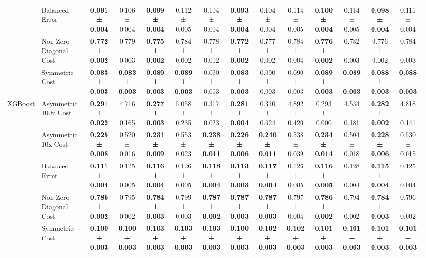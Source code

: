 \begin{table}[H]
{\begin{tabular}{llcccccccccccc}
 & Balanced Error & \textbf{0.091 ± 0.004} & 0.106 ± 0.004 & \textbf{0.099 ± 0.004} & 0.112 ± 0.005 & 0.104 ± 0.004 & \textbf{0.093 ± 0.004} & 0.104 ± 0.004 & 0.114 ± 0.005 & \textbf{0.100 ± 0.004} & 0.114 ± 0.005 & \textbf{0.098 ± 0.004} & 0.111 ± 0.004 \\
 & Non-Zero Diagonal Cost & \textbf{0.772 ± 0.002} & 0.779 ± 0.003 & \textbf{0.775 ± 0.002} & 0.784 ± 0.002 & 0.778 ± 0.002 & \textbf{0.772 ± 0.002} & 0.777 ± 0.002 & 0.784 ± 0.004 & \textbf{0.776 ± 0.002} & 0.782 ± 0.003 & 0.776 ± 0.002 & 0.784 ± 0.003 \\
 & Symmetric Cost & \textbf{0.083 ± 0.003} & \textbf{0.083 ± 0.003} & \textbf{0.089 ± 0.003} & \textbf{0.089 ± 0.003} & 0.090 ± 0.003 & \textbf{0.083 ± 0.003} & 0.090 ± 0.003 & 0.090 ± 0.003 & \textbf{0.089 ± 0.003} & \textbf{0.089 ± 0.003} & \textbf{0.088 ± 0.003} & \textbf{0.088 ± 0.003} \\
\cline{1-14}
\multirow[t]{5}{*}{XGBoost} & Asymmetric 100x Cost & \textbf{0.291 ± 0.022} & 4.716 ± 0.165 & \textbf{0.277 ± 0.003} & 5.058 ± 0.235 & 0.317 ± 0.023 & \textbf{0.281 ± 0.004} & 0.310 ± 0.024 & 4.892 ± 0.420 & 0.293 ± 0.000 & 4.534 ± 0.181 & \textbf{0.282 ± 0.002} & 4.818 ± 0.141 \\
 & Asymmetric 10x Cost & \textbf{0.225 ± 0.008} & 0.520 ± 0.016 & \textbf{0.231 ± 0.009} & 0.553 ± 0.023 & \textbf{0.238 ± 0.011} & \textbf{0.226 ± 0.006} & \textbf{0.240 ± 0.011} & 0.538 ± 0.039 & \textbf{0.234 ± 0.014} & 0.504 ± 0.018 & \textbf{0.228 ± 0.006} & 0.530 ± 0.015 \\
 & Balanced Error & \textbf{0.111 ± 0.004} & 0.125 ± 0.005 & \textbf{0.116 ± 0.004} & 0.126 ± 0.005 & \textbf{0.118 ± 0.004} & \textbf{0.113 ± 0.003} & \textbf{0.117 ± 0.004} & 0.126 ± 0.005 & \textbf{0.116 ± 0.005} & 0.128 ± 0.004 & \textbf{0.115 ± 0.004} & 0.125 ± 0.004 \\
 & Non-Zero Diagonal Cost & \textbf{0.786 ± 0.002} & 0.795 ± 0.002 & \textbf{0.784 ± 0.003} & 0.799 ± 0.003 & \textbf{0.787 ± 0.002} & \textbf{0.787 ± 0.003} & \textbf{0.787 ± 0.003} & 0.797 ± 0.004 & \textbf{0.786 ± 0.002} & 0.794 ± 0.002 & \textbf{0.784 ± 0.003} & 0.796 ± 0.002 \\
 & Symmetric Cost & \textbf{0.100 ± 0.003} & \textbf{0.100 ± 0.003} & \textbf{0.103 ± 0.003} & \textbf{0.103 ± 0.003} & \textbf{0.103 ± 0.003} & \textbf{0.100 ± 0.003} & \textbf{0.102 ± 0.003} & \textbf{0.102 ± 0.003} & \textbf{0.101 ± 0.003} & \textbf{0.101 ± 0.003} & \textbf{0.101 ± 0.003} & \textbf{0.101 ± 0.003} \\
\cline{1-14}
\bottomrule
\end{tabular}
    }
\end{table}
